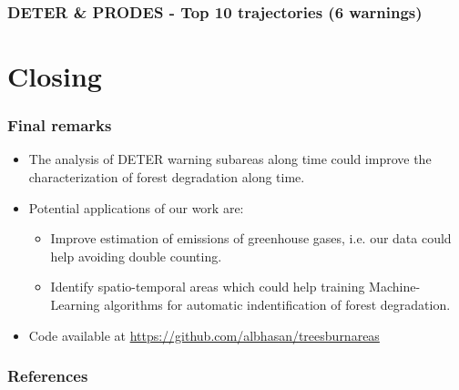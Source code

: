 \documentclass[aspectratio=169]{beamer}
\begin{document}
\begin{frame}[allowframebreaks]
    \frametitle{DETER \& PRODES - Top 10 trajectories (6 warnings)}
    
\end{frame}





\section{Closing}

\begin{frame}
    \frametitle{Final remarks}
    \begin{itemize}
        \item The analysis of DETER warning subareas along time could improve 
            the characterization of forest degradation along time.
        \item Potential applications of our work are:
            \begin{itemize}
                \item Improve estimation of emissions of greenhouse gases, i.e.
                    our data could help avoiding double counting.
                \item Identify spatio-temporal areas which could help training 
                    Machine-Learning algorithms for automatic indentification 
                    of forest degradation.
            \end{itemize}
        \item Code available at 
            \url{https://github.com/albhasan/treesburnareas}
    \end{itemize}
\end{frame}

\begin{frame}[allowframebreaks]
    \frametitle{References}
    
    
\end{frame}
\end{document}
